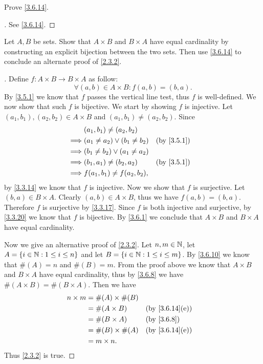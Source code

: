 \begin{ex}\label{ex:3.6.4}
	Prove \cref{3.6.14}.
\end{ex}

\begin{proof}[]
	See \cref{3.6.14}.
\end{proof}

\begin{ex}\label{ex:3.6.5}
	Let \(A, B\) be sets.
	Show that \(A \times B\) and \(B \times A\) have equal cardinality by constructing an explicit bijection between the two sets.
	Then use \cref{3.6.14} to conclude an alternate proof of \cref{2.3.2}.
\end{ex}

\begin{proof}[]
	Define \(f : A \times B \to B \times A\) as follow:
	\[
		\forall (a, b) \in A \times B : f(a, b) = (b, a).
	\]
	By \cref{3.5.1} we know that \(f\) passes the vertical line test, thus \(f\) is well-defined.
	We now show that such \(f\) is bijective.
	We start by showing \(f\) is injective.
	Let \((a_1, b_1), (a_2, b_2) \in A \times B\) and \((a_1, b_1) \neq (a_2, b_2)\).
	Since
	\begin{align*}
		         & (a_1, b_1) \neq (a_2, b_2)                         \\
		\implies & (a_1 \neq a_2) \lor (b_1 \neq b_2) &  & \by{3.5.1} \\
		\implies & (b_1 \neq b_2) \lor (a_1 \neq a_2)                 \\
		\implies & (b_1, a_1) \neq (b_2, a_2)         &  & \by{3.5.1} \\
		\implies & f(a_1, b_1) \neq f(a_2, b_2),
	\end{align*}
	by \cref{3.3.14} we know that \(f\) is injective.
	Now we show that \(f\) is surjective.
	Let \((b, a) \in B \times A\).
	Clearly \((a, b) \in A \times B\), thus we have \(f(a, b) = (b, a)\).
	Therefore \(f\) is surjective by \cref{3.3.17}.
	Since \(f\) is both injective and surjective, by \cref{3.3.20} we know that \(f\) is bijective.
	By \cref{3.6.1} we conclude that \(A \times B\) and \(B \times A\) have equal cardinality.

	Now we give an alternative proof of \cref{2.3.2}.
	Let \(n, m \in \mathbb{N}\), let \(A = \left\lbrace i \in \mathbb{N} : 1 \leq i \leq n\right\rbrace\) and let \(B = \left\lbrace i \in \mathbb{N} : 1 \leq i \leq m\right\rbrace\).
	By \cref{3.6.10} we know that \(\#(A) = n\) and \(\#(B) = m\).
	From the proof above we know that \(A \times B\) and \(B \times A\) have equal cardinality, thus by \cref{3.6.8} we have \(\#(A \times B) = \#(B \times A)\).
	Then we have
	\begin{align*}
		n \times m & = \#(A) \times \#(B)                                   \\
		           & = \#(A \times B)     &  & \text{(by \cref{3.6.14}(e))} \\
		           & = \#(B \times A)     &  & \by{3.6.8}                   \\
		           & = \#(B) \times \#(A) &  & \text{(by \cref{3.6.14}(e))} \\
		           & = m \times n.
	\end{align*}
	Thus \cref{2.3.2} is true.
\end{proof}

